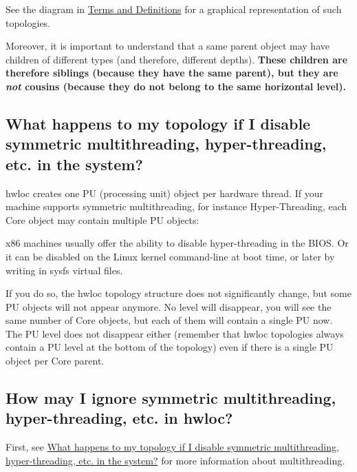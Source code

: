 See the diagram in \hyperlink{a00380}{Terms and Definitions} for a graphical representation of such topologies.

Moreover, it is important to understand that a same parent object may have children of different types (and therefore, different depths). {\bfseries These children are therefore siblings (because they have the same parent), but they are {\itshape not} cousins (because they do not belong to the same horizontal level).}\hypertarget{a00394_faq_nosmt}{}\subsection{What happens to my topology if I disable symmetric multithreading, hyper-\/threading, etc. in the system?}\label{a00394_faq_nosmt}
hwloc creates one PU (processing unit) object per hardware thread. If your machine supports symmetric multithreading, for instance Hyper-\/\+Threading, each Core object may contain multiple PU objects\+: 


x86 machines usually offer the ability to disable hyper-\/threading in the B\+I\+OS. Or it can be disabled on the Linux kernel command-\/line at boot time, or later by writing in sysfs virtual files.

If you do so, the hwloc topology structure does not significantly change, but some PU objects will not appear anymore. No level will disappear, you will see the same number of Core objects, but each of them will contain a single PU now. The PU level does not disappear either (remember that hwloc topologies always contain a PU level at the bottom of the topology) even if there is a single PU object per Core parent. 
\hypertarget{a00394_faq_smt}{}\subsection{How may I ignore symmetric multithreading, hyper-\/threading, etc. in hwloc?}\label{a00394_faq_smt}
First, see \hyperlink{a00394_faq_nosmt}{What happens to my topology if I disable symmetric multithreading, hyper-\/threading, etc. in the system?} for more information about multithreading.

